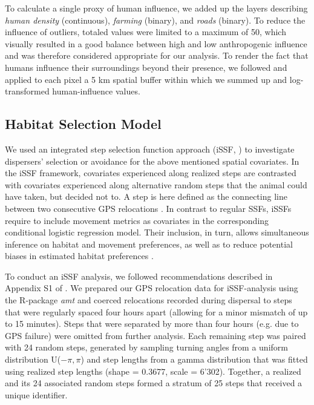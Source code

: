 \documentclass[abstract=on,10pt,a4paper,bibliography=totocnumbered]{scrartcl}
\begin{document}
To calculate a single proxy of human influence, we added up the layers
describing \textit{human density} (continuous), \textit{farming} (binary), and
\textit{roads} (binary). To reduce the influence of outliers, totaled values
were limited to a maximum of 50, which visually resulted in a good balance
between high and low anthropogenic influence and was therefore considered
appropriate for our analysis. To render the fact that humans influence their
surroundings beyond their presence, we followed \cite{Elliot.2014} and applied
to each pixel a 5 km spatial buffer within which we summed up and log-transformed
human-influence values.

\subsection{Habitat Selection Model}
\label{Modeling}
We used an integrated step selection function approach (iSSF,
\citealp{Avgar.2016}) to investigate dispersers' selection or avoidance for the
above mentioned spatial covariates. In the iSSF framework, covariates
experienced along realized steps are contrasted with covariates experienced
along alternative random steps that the animal could have taken, but decided not
to. A step is here defined as the connecting line between two consecutive GPS
relocations \citep{Turchin.1998}. In contrast to regular SSFs, iSSFs require to
include movement metrics as covariates in the corresponding conditional logistic
regression model. Their inclusion, in turn, allows simultaneous inference on
habitat and movement preferences, as well as to reduce potential biases in
estimated habitat preferences \citep{Forester.2009, Warton.2013, Avgar.2016}.

To conduct an iSSF analysis, we followed recommendations described in
Appendix S1 of \cite{Avgar.2016}. We prepared our GPS relocation data for
iSSF-analysis using the R-package \textit{amt} \citep{Amt.2019} and coerced
relocations recorded during dispersal to steps that were regularly spaced four
hours apart (allowing for a minor mismatch of up to 15 minutes). Steps that were
separated by more than four hours (e.g. due to GPS failure) were omitted from
further analysis. Each remaining step was paired with 24 random steps, generated
by sampling turning angles from a uniform distribution U(\(-\pi, \pi\)) and step
lengths from a gamma distribution that was fitted using realized step lengths
(shape = 0.3677, scale = 6'302). Together, a realized and its 24 associated
random steps formed a stratum of 25 steps that received a unique identifier.
\end{document}
